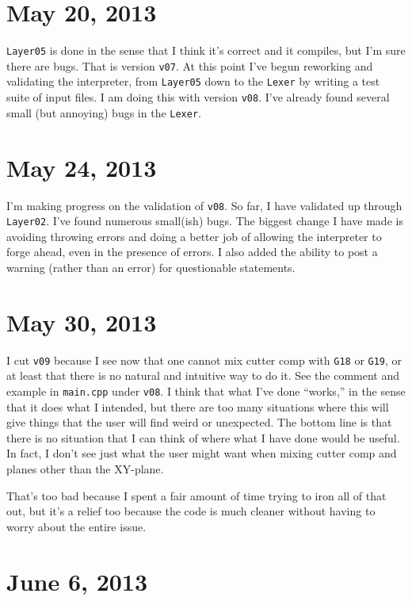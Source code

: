 \documentclass[titlepage,oneside,10pt]{article}
\begin{document}
\section{May 20, 2013}

{\tt Layer05} is done in the sense that I think it's correct and it
compiles, but I'm sure there are bugs. That is version {\tt v07}. At
this point I've begun reworking and validating the interpreter, from
{\tt Layer05} down to the {\tt Lexer} by writing a test suite of input
files. I am doing this with version {\tt v08}. I've already found
several small (but annoying) bugs in the {\tt Lexer}.

\section{May 24, 2013}

I'm making progress on the validation of {\tt v08}. So far, I have
validated up through {\tt Layer02}. I've found numerous small(ish)
bugs. The biggest change I have made is avoiding throwing errors and
doing a better job of allowing the interpreter to forge ahead, even in
the presence of errors. I also added the ability to post a warning
(rather than an error) for questionable statements.

\section{May 30, 2013}

I cut {\tt v09} because I see now that one cannot mix cutter comp with
{\tt G18} or {\tt G19}, or at least that there is no natural and
intuitive way to do it. See the comment and example in {\tt main.cpp}
under {\tt v08}. I think that what I've done ``works,'' in the sense
that it does what I intended, but there are too many situations where
this will give things that the user will find weird or unexpected. The
bottom line is that there is no situation that I can think of where
what I have done would be useful. In fact, I don't see just what the
user might want when mixing cutter comp and planes other than the
XY-plane.

That's too bad because I spent a fair amount of time trying to iron
all of that out, but it's a relief too because the code is much
cleaner without having to worry about the entire issue.

\section{June 6, 2013}
\end{document}

